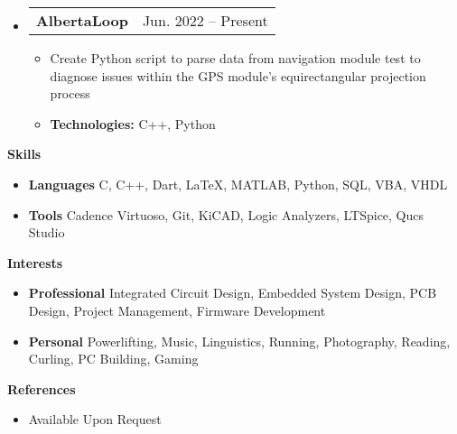 \documentclass[letterpaper,12pt]{article}[leftmargin=*]
\makeatletter
\def \entryspacing {-0pt}
\renewcommand{\section}[2]{\vspace{5pt}
  \colorbox{secondary}{\color{white}\raggedbottom\normalsize\textbf{{#1}{\hspace{7pt}#2}}}
}
\newcommand{\resumeEntryStart}{\begin{itemize}[leftmargin=2.5mm]}
\newcommand{\resumeEntryEnd}{\end{itemize}\vspace{\entryspacing}}
\newcommand{\resumeItemListStart}{\begin{itemize}[leftmargin=4.5mm]}
\newcommand{\resumeItemListEnd}{\end{itemize}}
\newcommand{\resumeItem}[1]{
  \item\small{
    {#1 \vspace{-2pt}}
  }
}
\newcommand{\resumeEntryTD}[2]{
  \vspace{-1pt}\item[]
    \begin{tabularx}{0.97\textwidth}{X@{\hspace{60pt}}r}
      \textbf{\color{primary}#1} & {\firabook\color{accent}\small#2} \\
    \end{tabularx}\vspace{-6pt}
}
\newcommand{\resumeEntryS}[2]{
  \item[]\small{
    \textbf{\color{primary}#1 }{ #2 \vspace{-6pt}}
  }
}
\makeatother
\begin{document}
 \resumeEntryStart
 \resumeEntryTD{AlbertaLoop}{Jun. 2022 -- Present}
 \resumeItemListStart
      \resumeItem {Create Python script to parse data from navigation module test to diagnose issues within the GPS module's equirectangular projection process}
      \resumeItem {\textbf{Technologies:} C++, Python}
    \resumeItemListEnd
 \resumeEntryEnd
\section{\faGears}{Skills}

 \resumeEntryStart
  \resumeEntryS{Languages } {C, C++, Dart, LaTeX, MATLAB, Python, SQL, VBA, VHDL}
  \resumeEntryS{Tools } {Cadence Virtuoso, Git, KiCAD, Logic Analyzers, LTSpice, Qucs Studio}
 \resumeEntryEnd

\section{\faGamepad}{Interests}

 \resumeEntryStart
  \resumeEntryS{Professional }{Integrated Circuit Design, Embedded System Design, PCB Design, Project Management, Firmware Development}
  \resumeEntryS{Personal }{Powerlifting, Music, Linguistics, Running, Photography, Reading, Curling, PC Building, Gaming}
 \resumeEntryEnd
\section{\faEnvelope}{References}

 \resumeEntryStart
  \resumeEntryS{}{Available Upon Request}
 \resumeEntryEnd
\end{document}
